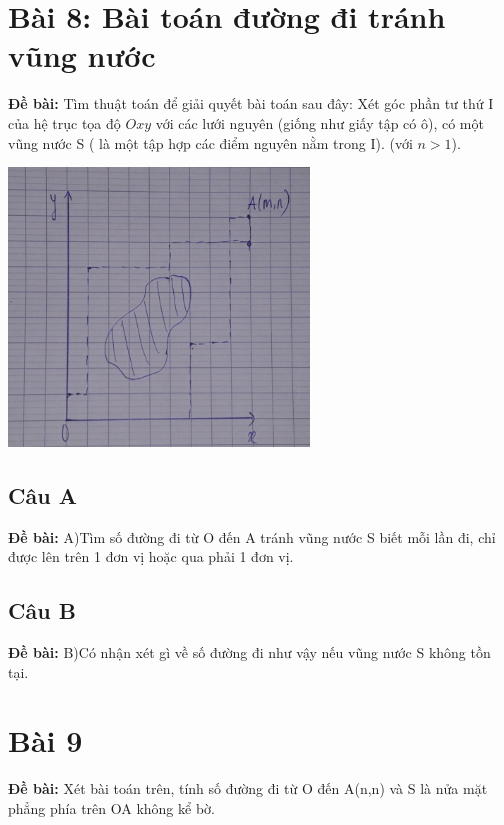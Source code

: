 \documentclass[12pt]{article}
\begin{document}
\begin{sloppypar}
\section{Bài 8: Bài toán đường đi tránh vũng nước}
\begin{tcolorbox}
    \textbf{Đề bài:} Tìm thuật toán để giải quyết bài toán sau đây: Xét góc phần tư thứ I của hệ trục tọa độ \(Oxy\) với các lưới nguyên (giống như giấy tập có ô), có một vũng nước S ( là một tập hợp các điểm nguyên nằm trong I).
    (với \(n > 1\)).
\end{tcolorbox}

\begin{center}
    {\includegraphics[width=8cm]{7.png}}
\end{center}

\subsection{Câu A}
\begin{tcolorbox}
    \textbf{Đề bài:} A)Tìm số đường đi từ O đến A tránh vũng nước S biết mỗi lần đi, chỉ được lên trên 1 đơn vị hoặc qua phải 1 đơn vị.
\end{tcolorbox}
\subsection{Câu B}
\begin{tcolorbox}
    \textbf{Đề bài:} B)Có nhận xét gì về số đường đi như vậy nếu vũng nước S không tồn tại.
\end{tcolorbox}

\section{Bài 9}
\begin{tcolorbox}
    \textbf{Đề bài:} Xét bài toán trên, tính số đường đi từ O đến A(n,n) và S là nửa mặt phẳng phía trên OA không kể bờ.
\end{tcolorbox}


\end{sloppypar}
\end{document}
